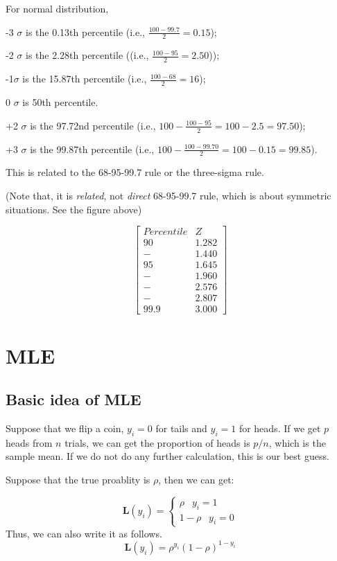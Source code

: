 \documentclass[
]{book}
\begin{document}
For normal distribution,

-3 \(\sigma\) is the 0.13th percentile (i.e., \(\frac{100-99.7}{2}=0.15\));

-2 \(\sigma\) is the 2.28th percentile ((i.e., \(\frac{100-95}{2}=2.50\)));

-1\(\sigma\) is the 15.87th percentile (i.e., \(\frac{100-68}{2}=16\));

0 \(\sigma\) is 50th percentile.

+2 \(\sigma\) is the 97.72nd percentile (i.e., \(100-\frac{100-95}{2}=100-2.5=97.50\));

+3 \(\sigma\) is the 99.87th percentile (i.e., \(100-\frac{100-99.70}{2}=100-0.15=99.85\)).

This is related to the 68-95-99.7 rule or the three-sigma rule.

(Note that, it is \emph{related}, not \emph{direct} 68-95-99.7 rule, which is about symmetric situations. See the figure above)

\[\begin{bmatrix}
Percentile & Z \\
90  & 1.282 \\
- & 1.440 \\
95 & 1.645 \\
- & 1.960 \\
- & 2.576 \\
- & 2.807 \\
99.9 & 3.000 \end{bmatrix}\]

\hypertarget{intro}{%
\chapter{MLE}\label{intro}}

\hypertarget{basic-idea-of-mle}{%
\section{Basic idea of MLE}\label{basic-idea-of-mle}}

Suppose that we flip a coin, \(y_i=0\) for tails and \(y_i=1\) for heads. If we get \(p\) heads from \(n\) trials, we can get the proportion of heads is \(p/n\), which is the sample mean. If we do not do any further calculation, this is our best guess.

Suppose that the true proablity is \(\rho\), then we can get:

\[
\mathbf{L}(y_i)=\begin{cases} \rho \;\;\:   y_i = 1 \\ 1-\rho \;\;\:  y_i = 0 \end{cases}
\]
Thus, we can also write it as follows.
\[\mathbf{L}(y_i) = \rho^{y_i}(1-\rho)^{1-y_i}\]
\end{document}
